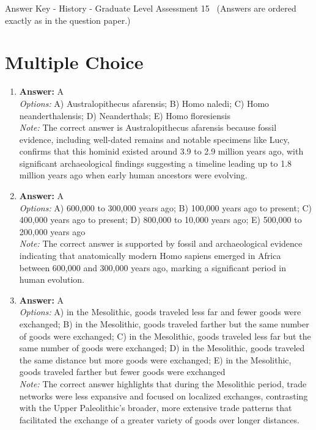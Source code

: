 \documentclass[12pt]{article}
\begin{document}
\begin{center}
Answer Key - History - Graduate Level Assessment 15 \
\small (Answers are ordered exactly as in the question paper.)
\end{center}

\section*{Multiple Choice}
\begin{enumerate}[label=\arabic*.]
\item \textbf{Answer:} A
\\ \textit{Options:} A) Australopithecus afarensis; B) Homo naledi; C) Homo neanderthalensis; D) Neanderthals; E) Homo floresiensis
\\ \textit{Note:} The correct answer is Australopithecus afarensis because fossil evidence, including well-dated remains and notable specimens like Lucy, confirms that this hominid existed around 3.9 to 2.9 million years ago, with significant archaeological findings suggesting a timeline leading up to 1.8 million years ago when early human ancestors were evolving.
\item \textbf{Answer:} A
\\ \textit{Options:} A) 600,000 to 300,000 years ago; B) 100,000 years ago to present; C) 400,000 years ago to present; D) 800,000 to 10,000 years ago; E) 500,000 to 200,000 years ago
\\ \textit{Note:} The correct answer is supported by fossil and archaeological evidence indicating that anatomically modern Homo sapiens emerged in Africa between 600,000 and 300,000 years ago, marking a significant period in human evolution.
\item \textbf{Answer:} A
\\ \textit{Options:} A) in the Mesolithic, goods traveled less far and fewer goods were exchanged; B) in the Mesolithic, goods traveled farther but the same number of goods were exchanged; C) in the Mesolithic, goods traveled less far but the same number of goods were exchanged; D) in the Mesolithic, goods traveled the same distance but more goods were exchanged; E) in the Mesolithic, goods traveled farther but fewer goods were exchanged
\\ \textit{Note:} The correct answer highlights that during the Mesolithic period, trade networks were less expansive and focused on localized exchanges, contrasting with the Upper Paleolithic's broader, more extensive trade patterns that facilitated the exchange of a greater variety of goods over longer distances.

\end{enumerate}
\end{document}
